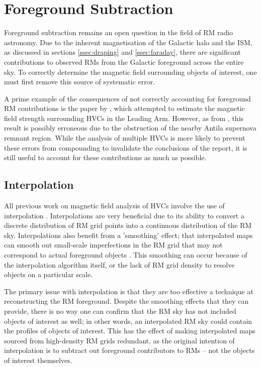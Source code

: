 \chapter{Foreground Subtraction}
\label{cha:FR}

Foreground subtraction remains an open question in the field of RM radio astronomy. Due to the inherent magnetisation of the Galactic halo and the ISM, as discussed in sections \ref{ssec:draping} and \ref{ssec:faraday}, there are significant contributions to observed RMs from the Galactic foreground across the entire sky. To correctly determine the magnetic field surrounding objects of interest, one must first remove this source of systematic error.


A prime example of the consequences of not correctly accounting for foreground RM contributions is the paper by \cite{ID2}, which attempted to estimate the magnetic field strength surrounding HVCs in the Leading Arm. However, as from \cite{ID36}, this result is possibly erroneous due to the obstruction of the nearby Antila supernova remnant region. While the analysis of multiple HVCs is more likely to prevent these errors from compounding to invalidate the conclusions of the report, it is still useful to account for these contributions as much as possible.

\section{Interpolation}
\label{sec:intp}

All previous work on magnetic field analysis of HVCs involve the use of interpolation \citep{ID3, ID5, ID6, ID26}. Interpolations are very beneficial due to its ability to convert a discrete distribution of RM grid points into a continuous distribution of the RM sky. Interpolations also benefit from a 'smoothing' effect; that interpolated maps can smooth out small-scale imperfections in the RM grid that may not correspond to actual foreground objects \citep{ID44, ID45, ID58}. This smoothing can occur because of the interpolation algorithm itself, or the lack of RM grid density to resolve objects on a particular scale.


The primary issue with interpolation is that they are too effective a technique at reconstructing the RM foreground. Despite the smoothing effects that they can provide, there is no way one can confirm that the RM sky has not included objects of interest as well; in other words, an interpolated RM sky could contain the profiles of objects of interest. This has the effect of making interpolated maps sourced from high-density RM grids redundant, as the original intention of interpolation is to subtract out foreground contributors to RMs – not the objects of interest themselves.


